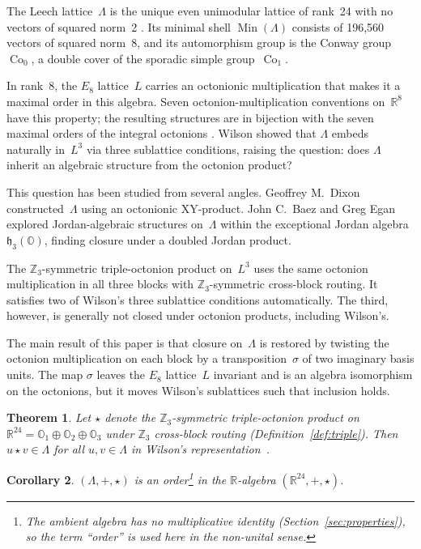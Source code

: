 \documentclass[twoside,english]{paper}
\numberwithin{equation}{section}
\numberwithin{figure}{section}
\newtheorem{theorem}{Theorem}[section]
\newtheorem{corollary}[theorem]{Corollary}
\theoremstyle{definition}
\theoremstyle{remark}
\newcommand{\OO}{\mathbb{O}}          %
\newcommand{\RR}{\mathbb{R}}
\newcommand{\ZZ}{\mathbb{Z}}
\newcommand{\LL}{\Lambda}             %
\DeclareMathOperator{\Co}{Co}
\begin{document}
The Leech lattice~$\LL$ is the unique even unimodular lattice of
rank~24 with no vectors of squared norm~2
\cite{ConwaySloane1999}.  Its minimal shell $\operatorname{Min}(\LL)$
consists of 196{,}560 vectors of squared norm~8, and its automorphism
group is the Conway group~$\Co_0$, a double cover of the sporadic
simple group~$\Co_1$.

In rank~8, the $E_8$ lattice~$L$ carries an octonionic multiplication
that makes it a maximal order in this algebra.
Seven octonion-multiplication conventions on~$\RR^8$ have this
property; the resulting structures are in bijection with the seven
maximal orders of the integral octonions
\cite{Coxeter1946, ConwaySmith2003}.  Wilson
\cite[Section~3]{Wilson2009} showed that $\LL$ embeds naturally
in~$L^3$ via three sublattice conditions, raising the question: does
$\LL$ inherit an algebraic structure from the octonion product?

This question has been studied from several angles.  Geoffrey
M.~Dixon \cite{Dixon2010} constructed~$\LL$ using an octonionic
XY-product.  John C.~Baez and Greg Egan \cite{Baez2014} explored
Jordan-algebraic structures on~$\LL$ within the exceptional Jordan
algebra~$\mathfrak{h}_3(\OO)$, finding closure under a doubled
Jordan product.

The $\ZZ_3$-symmetric triple-octonion product on~$L^3$ uses the
same octonion multiplication in all three blocks with
$\ZZ_3$-symmetric cross-block routing.  It satisfies two of Wilson's
three sublattice conditions automatically.  The third, however, is
generally not closed under octonion products, including Wilson's.

The main result of this paper is that closure on~$\LL$ is restored
by twisting the octonion multiplication on each block by a
transposition~$\sigma$ of two imaginary basis units.  The map
$\sigma$ leaves the $E_8$ lattice~$L$ invariant and is an algebra
isomorphism on the octonions, but it moves Wilson's sublattices
such that inclusion holds.

\begin{theorem}\label{thm:main}
Let\/ $\star$ denote the $\ZZ_3$-symmetric triple-octonion product
on~$\RR^{24} = \OO_1 \oplus \OO_2 \oplus \OO_3$
under $\ZZ_3$ cross-block routing (Definition~\ref{def:triple}).
Then $u \star v \in \LL$ for all $u, v \in \LL$ in Wilson's
representation~\cite{Wilson2009}.
\end{theorem}

\begin{corollary}\label{cor:order}
$(\LL, +, \star)$ is an order\footnote{The ambient algebra has no
multiplicative identity (Section~\ref{sec:properties}), so the term
``order'' is used here in the non-unital sense.} in the $\RR$-algebra
$(\RR^{24}, +, \star)$.
\end{corollary}
\end{document}
